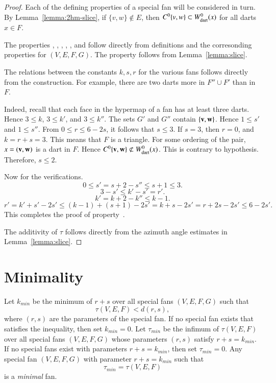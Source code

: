 \begin{proof}  Each of the defining properties of a special fan will be considered in turn.  By Lemma~\ref{lemma:2hm-slice}, if $\{v,w\}\not\in E$, then $C^0\{v,w\}\subset W^0_{\text{dart}}(x)$ for all darts $x\in F$.

The properties , , , , , and  follow directly from definitions and the corresonding properties for $(V,E,F,G)$.
The property  follows from Lemma~\ref{lemma:slice}.

The relations between the constants $k,s,r$ for the various fans follows directly from the construction.
For example, there are two darts more in $F''\cup F'$ than in $F$.  

  Indeed, recall that each face in the hypermap of a fan has at least three darts.  Hence $3\le k$, $3\le k'$, and $3\le k''$.
The sets $G'$ and $G''$ contain $\{{\mathbf v},{\mathbf w}\}$.  Hence $1\le s'$ and $1\le s''$.
From $0\le r\le 6 - 2s$, it follows that $s\le 3$.  If $s=3$, then $r=0$, and $k=r+s=3$.  This means that $F$ is a triangle.  For some ordering of the pair, $x=({\mathbf v},{\mathbf w})$ is a dart in $F$.
Hence  $C^0\{{\mathbf v},{\mathbf w}\} \not\subset W^0_{\text{dart}}(x)$.  This is contrary to hypothesis.  Therefore, $s\le 2$.

Now for the verifications.
$$0\le s' = s + 2 - s'' \le s+1\le 3.$$
$$3-s'\le k'-s' = r'.$$
$$k' = k + 2 - k'' \le k-1.$$
$$
r'= k'+s' - 2 s' \le (k-1) + (s+1) - 2s' =k+s - 2s' = r + 2s -2s' \le 6 - 2s'.
$$
This completes the proof of property~.

The additivity of $\tau$ follows directly from the azimuth angle estimates in Lemma~\ref{lemma:slice}.
\end{proof}


\section{Minimality}



\begin{definition}
Let $k_{min}$ be the minimum of $r+s$ over
all special fans $(V,E,F,G)$ such that 
\begin{equation}\label{eqn:kmin}
\tau(V,E,F) < d (r,s),
\end{equation}
where $(r,s)$ are the parameters of the special fan.
If no special fan exists that satisfies the inequality, then set $k_{min}=0$.
Let $\tau_{min}$ be the infimum of $\tau(V,E,F)$ over all special fans
$(V,E,F,G)$ whose parameters $(r,s)$ satisfy $r+s=k_{min}$.  If no special fans
exist with parameters $r+s=k_{min}$, then set $\tau_{min}=0$.
Any special fan $(V,E,F,G)$ with parameter $r+s=k_{min}$ such that
$$
\tau_{min}= \tau(V,E,F)
$$
is a {\it minimal}  fan.
\end{definition}

